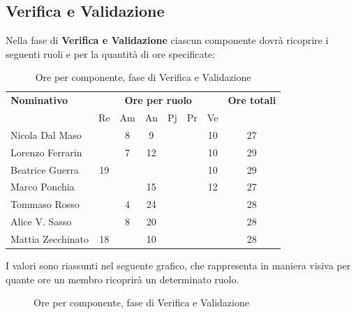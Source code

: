 \subsection{Verifica e Validazione}
Nella fase di \textbf{Verifica e Validazione} ciascun componente dovrà ricoprire i seguenti ruoli e per la quantità di ore specificate:

\begin{table}[H]
	\centering
	\begin{tabular}{|l|c|c|c|c|c|c|c|}
		\hline
		\textbf{Nominativo} & 
		\multicolumn{6}{c|}{\textbf{Ore per ruolo}} & 
		\textbf{Ore totali} \\
		& Re & Am & An & Pj & Pr & Ve & \\
		\hline
		Nicola Dal Maso & & 8 & 9 & & & 10 & 27 \\
		Lorenzo Ferrarin & & 7 & 12 & & & 10 & 29 \\
		Beatrice Guerra & 19 & & & & & 10 & 29 \\
		Marco Ponchia & & & 15 & & & 12 & 27 \\
		Tommaso Rosso & & 4 & 24 & & & & 28 \\
		Alice V. Sasso & & 8 & 20 & & & & 28 \\
		Mattia Zecchinato & 18 & & 10 & & & & 28 \\
		\hline
	\end{tabular}
	\caption{Ore per componente, fase di Verifica e Validazione}
\end{table}
I valori sono riassunti nel seguente grafico, che rappresenta in maniera visiva per quante ore un membro ricoprirà un determinato ruolo.
\begin{figure}[H]
	\centering
	\caption{Ore per componente, fase di Verifica e Validazione}
\end{figure}

